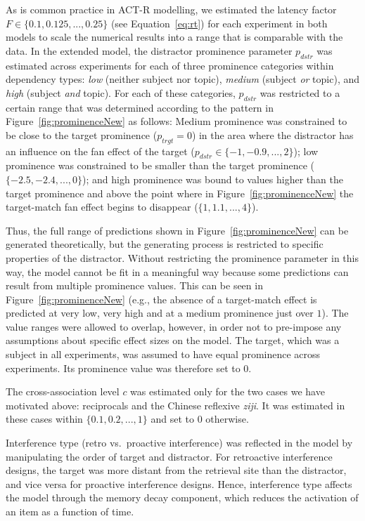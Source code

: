 \documentclass{cambridge7A}\usepackage[]{graphicx}\usepackage[]{color}
\begin{document}
As is common practice in ACT-R modelling, we estimated the latency factor $F \in \{0.1, 0.125, ..., 0.25\}$ (see Equation~\ref{eq:rt}) for each experiment in both models to scale the numerical results into a range that is comparable with the data.
In the extended model, the distractor prominence parameter $p_{dstr}$ was estimated across experiments for each of three prominence categories within dependency types: \emph{low} (neither subject nor topic), \emph{medium} (subject \emph{or} topic), and \emph{high} (subject \emph{and} topic).
For each of these categories, $p_{dstr}$ was restricted to a certain range that was determined according to the pattern in Figure~\ref{fig:prominenceNew} as follows:
Medium prominence was constrained to be close to the target prominence ($p_{trgt} = 0$) in the area where the distractor has an influence on the fan effect of the target ($p_{dstr} \in \{-1, -0.9, ..., 2\}$); low prominence was constrained to be smaller than the target prominence ($\{-2.5, -2.4, ..., 0\}$); and high prominence was bound to values higher than the target prominence and above the point where in Figure~\ref{fig:prominenceNew} the target-match fan effect begins to disappear ($\{1, 1.1, ..., 4\}$).

Thus, the full range of predictions shown in Figure~\ref{fig:prominenceNew} can be generated theoretically, but the generating process is restricted to specific properties of the distractor. 
Without restricting the prominence parameter in this way, the model cannot be fit in a meaningful way because some predictions can result from multiple prominence values. This can be seen in Figure~\ref{fig:prominenceNew} (e.g., the absence of a target-match effect is predicted at very low, very high and at a medium prominence just over $1$).
The value ranges were allowed to overlap, however, in order not to pre-impose any assumptions about specific effect sizes on the model.
The target, which was a subject in all experiments, was assumed to have equal prominence across experiments. Its prominence value was therefore set to $0$.


The cross-association level $c$ was estimated only for the two cases we have motivated above: reciprocals and the Chinese reflexive \emph{ziji}. It was estimated in these cases within $\{0.1, 0.2, ..., 1\}$ and set to $0$ otherwise.

Interference type (retro vs.\ proactive interference) was reflected in the model by manipulating the order of target and distractor. For  retroactive interference designs, the target was more distant from the retrieval site than the distractor, and vice versa for  proactive interference designs. Hence, interference type affects the model through the memory decay component, which reduces the activation of an item as a function of time.
\end{document}
